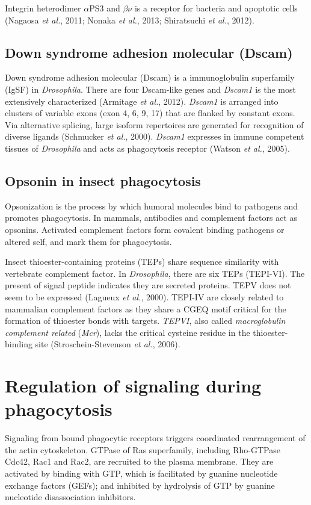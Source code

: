\documentclass[11pt]{article}
\begin{document}
\newline

Integrin heterodimer $\alpha$PS3 and $\beta\nu$ is a receptor for bacteria and apoptotic cells (Nagaosa \textit{et al.}, 2011; Nonaka \textit{et al.}, 2013; Shiratsuchi \textit{et al.}, 2012).

\subsection{Down syndrome adhesion molecular (Dscam)}
Down syndrome adhesion molecular (Dscam) is a immunoglobulin superfamily (IgSF) in \textit{Drosophila}. 
There are four Dscam-like genes and \textit{Dscam1} is the most extensively characterized (Armitage \textit{et al.}, 2012). 
\textit{Dscam1} is arranged into clusters of variable exons (exon 4, 6, 9, 17) that are flanked by constant exons. 
Via alternative splicing, large isoform repertoires are generated for recognition of diverse ligands (Schmucker \textit{et al.}, 2000). 
\textit{Dscam1} expresses in immune competent tissues of \textit{Drosophila} and acts as phagocytosis receptor (Watson \textit{et al.}, 2005). 

\subsection{Opsonin in insect phagocytosis}
Opsonization is the process by which humoral molecules bind to pathogens and promotes phagocytosis. 
In mammals, antibodies and complement factors act as opsonins. 
Activated complement factors form covalent binding pathogens or altered self, and mark them for phagocytosis. 

\newline

Insect thioester-containing proteins (TEPs) share sequence similarity with vertebrate complement factor. 
In \textit{Drosophila}, there are six TEPs (TEPI-VI). 
The present of signal peptide indicates they are secreted proteins. 
TEPV does not seem to be expressed (Lagueux \textit{et al.}, 2000). 
TEPI-IV are closely related to mammalian complement factors as they share a CGEQ motif critical for the formation of thioester bonds with targets. 
\textit{TEPVI}, also called \textit{macroglobulin complement related} (\textit{Mcr}), lacks the critical cysteine residue in the thioester-binding site (Stroschein-Stevenson \textit{et al.}, 2006). 

\section{Regulation of signaling during phagocytosis}
Signaling from bound phagocytic receptors triggers coordinated rearrangement of the actin cytoskeleton. 
GTPase of Ras superfamily, including Rho-GTPase Cdc42, Rac1 and Rac2, are recruited to the plasma membrane. 
They are activated by binding with GTP, which is facilitated by guanine nucleotide exchange factors (GEFs); 
and inhibited by hydrolysis of GTP by guanine nucleotide disassociation inhibitors. 
\end{document}
